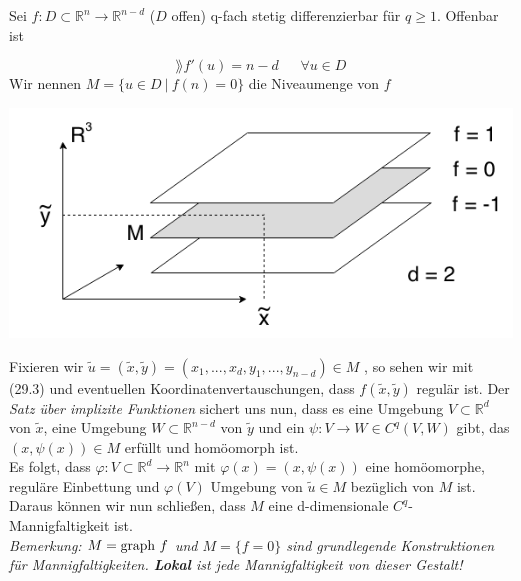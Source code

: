 \begin{beispiel}
Sei $f:D\subset\mathbb{R}^n\rightarrow\mathbb{R}^{n-d}$ ($D$ offen) q-fach stetig differenzierbar für $q\geq 1$. Offenbar ist

\begin{equation}
\rang f'(u)=n-d \ \ \ \ \ \ \ \forall u\in D
\end{equation}
Wir nennen $M=\{u\in D \ | \ f(n)=0\}$ die Niveaumenge von $f$\\

\begin{center}\includegraphics[scale=0.5]{pictures/MA2_0009}\\
\end{center}

Fixieren wir $\tilde{u}=(\tilde{x},\tilde{y})=(x_1,...,x_d,y_1,...,y_{n-d})\in M$
, so sehen wir mit (29.3) und eventuellen Koordinatenvertauschungen, dass 
$f(\tilde{x},\tilde{y})$ regulär ist. Der \emph{Satz über implizite Funktionen}
sichert uns nun, dass es eine Umgebung $V\subset\mathbb{R}^d$ von $\tilde{x}$, 
eine Umgebung $W\subset\mathbb{R}^{n-d}$ von $\tilde{y}$ und ein 
$\psi:V\rightarrow W\in C^q(V,W)$ gibt, das $(x,\psi(x))\in M$ erfüllt und homöomorph ist.\\
Es folgt, dass $\varphi:V\subset\mathbb{R}^d\rightarrow\mathbb{R}^n$ mit
$\varphi(x)=(x,\psi(x))$ eine homöomorphe, reguläre Einbettung  und $\varphi(V)$ 
Umgebung von $\tilde{u}\in M$ bezüglich von $M$ ist. Daraus können wir nun schließen, 
dass $M$ eine d-dimensionale $C^q$-Mannigfaltigkeit ist.\\
\linebreak
\emph{Bemerkung: $M=\text{graph\ } f$ und $M=\{f=0\}$ sind grundlegende Konstruktionen 
für Mannigfaltigkeiten. \textbf{Lokal} ist jede Mannigfaltigkeit von dieser Gestalt!}
\end{beispiel}

